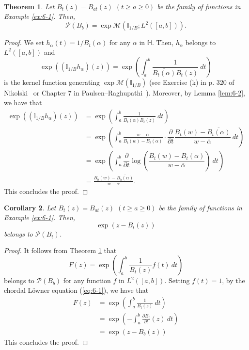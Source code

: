 \documentclass[12pt]{article}
\newtheorem{thm}{Theorem}[section]
\newtheorem{cor}[thm]{Corollary}
\numberwithin{equation}{section}
\newcommand{\M}{{\mathcal M}}
\newcommand{\cP}{{\mathcal P}}
\newcommand{\bH}{{\mathbb H}}
\newcommand{\bI}{{\mathbb I}}
\newcommand{\p}{\partial}
\begin{document}
\begin{thm}\label{thm:6-3}
Let $B_t(z)=B_{at}(z)$ $(t\geq a\geq 0)$ be the family of functions in Example \ref{ex:6-1}.
Then, 
\[
\cP(B_b)=\exp \M(\bI_{1/B}; L^2([a,b])).
\]
\end{thm}

\begin{proof}
We set $h_{\alpha}(t)=1/\overline{B_t(\alpha)}$ for any $\alpha$ in $\bH$. 
Then, $h_{\alpha}$ belongs to $L^2([a,b])$ and
\[
\exp ((\bI_{1/B} h_{\alpha})(z))=\exp\left(\int_a^b \frac{1}{\overline{B_t(\alpha)}B_t(z)}\ dt\right)
\]
is the kernel function generating $\exp \M(\bI_{1/B})$ 
(see Exercise (k) in p. 320 of Nikolski~\cite{Nik} or Chapter 7 in Paulsen--Raghupathi~\cite{PR}). 
Moreover, by Lemma \ref{lem:6-2}, we have that  
\begin{align*}
\exp ((\bI_{1/B} h_{\alpha})(z))
&=\exp \left(\int_a^b \frac{1}{\overline{B_t(\alpha)}B_t(z)}\ dt\right)\\
&=\exp \left(\int_a^b\frac{w-\overline{\alpha}}{B_t(w)-\overline{B_t(\alpha)}}
\cdot \dfrac{\p}{\p t}\dfrac{B_t(w)-\overline{B_t(\alpha)}}{w-\overline{\alpha}}\ dt\right)
\\
&=\exp \left(\int_a^b \dfrac{\p}{\p t}\log \left(\dfrac{B_t(w)-\overline{B_t(\alpha)}}{w-\overline{\alpha}}\right)\ dt\right)\\
&=\frac{B_b(w)-\overline{B_b(\alpha)}}{w-\overline{\alpha}}.
\end{align*} 
This concludes the proof.
\end{proof}




\begin{cor}\label{cor:6-4}
Let $B_t(z)=B_{at}(z)$ $(t\geq a\geq 0)$ be the family of functions in Example \ref{ex:6-1}.
Then, 
\[
\exp(z-B_t(z))
\]
belongs to $\cP(B_t)$. 
\end{cor}

\begin{proof}
It follows from Theorem \ref{thm:6-3} that  
\[
F(z)=\exp \left(\int_a^b \frac{1}{B_t(z)}f(t)\ dt\right)
\]
belongs to $\cP(B_b)$ for any function $f$ in $L^2([a,b])$. 
Setting $f(t)=1$, by the chordal L\"{o}wner equation (\ref{eq:6-1}), we have that 
\begin{align*}
F(z)
&=\exp \left(\int_a^b \frac{1}{B_t(z)}\ dt\right)\\
&=\exp \left(-\int_a^b \frac{\p B_t}{\p t}(z)\ dt\right)\\
&=\exp(z-B_b(z))
\end{align*}
This concludes the proof. 
\end{proof}
\end{document}
